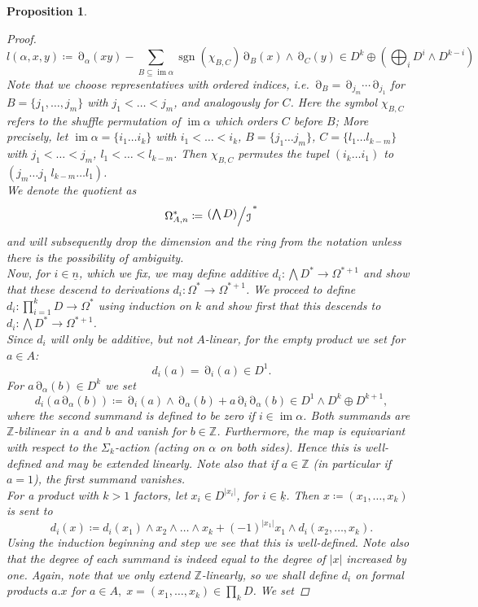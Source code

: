 \documentclass[10pt, a4paper, UKenglish]{article}
\numberwithin{equation}{section}
\newcommand{\bZ}{\mathbb{Z}}
\newcommand{\defas}{\coloneqq}  %
\newcommand{\abs}[1]{\left\vert#1\right\vert}	%
\newcommand{\ind}[1]{\underline{#1}}
\newcommand{\sgn}{\operatorname{sgn}}
\newcommand{\im}{\operatorname{im}}
\newcommand{\omgn}{\Omega_{A,n}}
\theoremstyle{plain}
\newtheorem{prop}[equation]{Proposition}
\theoremstyle{definition}
\renewcommand{\to}{\longrightarrow}
\newcommand{\del}{\operatorname{\partial}}
\newcommand{\bigmod}[2]{{\left.\raisebox{.2em}{$#1$}\middle/\raisebox{-.2em}{$#2$}\right.}}
\begin{document}
\begin{prop}
\begin{proof}
\[ l(\alpha,x,y) \defas \del_\alpha(xy) - \sum_{B \subseteq \im \alpha} \sgn(\chi_{B,C}) %
  \del_B (x) \wedge \del_C (y) \in D^k \oplus ( \bigoplus_i D^i \wedge D^{k-i} ) \]
Note that we choose representatives with ordered indices, i.e. $\del_B= \del_{j_m} \cdots \del_{j_1}$ for $B = \{ j_1, \ldots, j_m \}$ with $j_1 < \ldots < j_m$, and analogously for $C$. Here the symbol $\chi_{B,C}$ refers to the shuffle permutation of $\im \alpha$ which orders $C$ before $B$; More precisely, let $\im \alpha = \{ i_1 \ldots i_k \}$ with $i_1 < \ldots < i_k$, $B = \{j_1 \ldots j_m \}$, $C = \{ l_1 \ldots l_{k-m} \}$ with $j_1 < \ldots < j_m$, $l_1 < \ldots < l_{k-m}$. Then $\chi_{B,C}$ permutes the tupel $(i_k \ldots i_1)$ to $(j_m \ldots j_1 \; l_{k-m} \ldots l_1)$.\\
We denote the quotient as%
\[ \omgn^* \coloneqq \bigmod {\left(\bigwedge D\right)} {\mathcal{I}} ^* \]%
and will subsequently drop the dimension and the ring from the notation unless there is the possibility of ambiguity.\\
Now, for $i \in \ind{n}$, which we fix, we may define additive $d_i: \bigwedge D^* \to \Omega^{*+1} $ and show that these descend to derivations ${d_i: \Omega^* \to \Omega^{*+1}}$. We proceed to define $d_i: \prod_{i=1}^k D \to \Omega^*$ using induction on $k$ and show first that this descends to $d_i: \bigwedge D^* \to \Omega^{*+1}$.\\
Since $d_i$ will only be additive, but not $A$-linear, for the empty product we set for $a \in A$:
\[
  d_i (a) = \del_i (a) \in D^1.
\]
For $a \del_\alpha (b) \in D^k$ we set
\[ d_i (a \del_\alpha (b)) \coloneqq  \del_i (a) \wedge \del_\alpha (b) + a \del_i \del_\alpha (b) \in D^1 \wedge D^k \oplus D^{k+1}, \]
where the second summand is defined to be zero if $i \in \im \alpha$. Both summands are $\bZ$-bilinear in $a$ and $b$ and vanish for $b \in \bZ$. Furthermore, the map is equivariant with respect to the $\Sigma_k$-action (acting on $\alpha$ on both sides). Hence this is well-defined and may be extended linearly. Note also that if $a \in \bZ$ (in particular if $a = 1$), the first summand vanishes.
\\
For a product with $k>1$ factors, let $x_i \in D^{\abs{x_i}}$, for $i \in \ind{k}$. Then $ x \defas ( x_1 , \ldots , x_k ) $ is sent to
    \[ d_i (x) \coloneqq%
    d_i (x_1) \wedge x_2 \wedge \ldots \wedge x_k + %
    (-1)^{\abs{x_1}} x_1 \wedge d_i (x_2, \ldots, x_k). \]%
Using the induction beginning and step we see that this is well-defined. Note also that the degree of each summand is indeed equal to the degree of $\abs{x}$ increased by one. Again, note that we only extend $\bZ$-linearly, so we shall define $d_i$ on formal products $a.x$ for $a \in A, \; x = (x_1 , \ldots , x_k) \in \prod_k D$. We set

\end{proof}
\end{prop}
\end{document}
